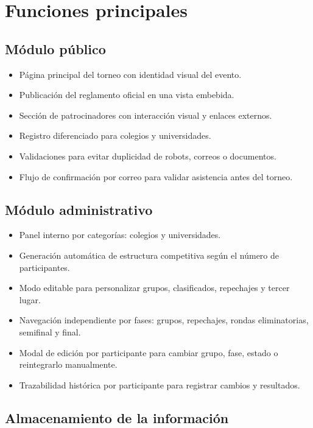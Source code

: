 \documentclass[12pt,a4paper]{article}
\begin{document}
\section{Funciones principales}

\subsection{Módulo público}

\begin{itemize}[leftmargin=1.2cm]
    \item Página principal del torneo con identidad visual del evento.
    \item Publicación del reglamento oficial en una vista embebida.
    \item Sección de patrocinadores con interacción visual y enlaces externos.
    \item Registro diferenciado para colegios y universidades.
    \item Validaciones para evitar duplicidad de robots, correos o documentos.
    \item Flujo de confirmación por correo para validar asistencia antes del torneo.
\end{itemize}

\subsection{Módulo administrativo}

\begin{itemize}[leftmargin=1.2cm]
    \item Panel interno por categorías: colegios y universidades.
    \item Generación automática de estructura competitiva según el número de participantes.
    \item Modo editable para personalizar grupos, clasificados, repechajes y tercer lugar.
    \item Navegación independiente por fases: grupos, repechajes, rondas eliminatorias, semifinal y final.
    \item Modal de edición por participante para cambiar grupo, fase, estado o reintegrarlo manualmente.
    \item Trazabilidad histórica por participante para registrar cambios y resultados.
\end{itemize}

\subsection{Almacenamiento de la información}
\end{document}
